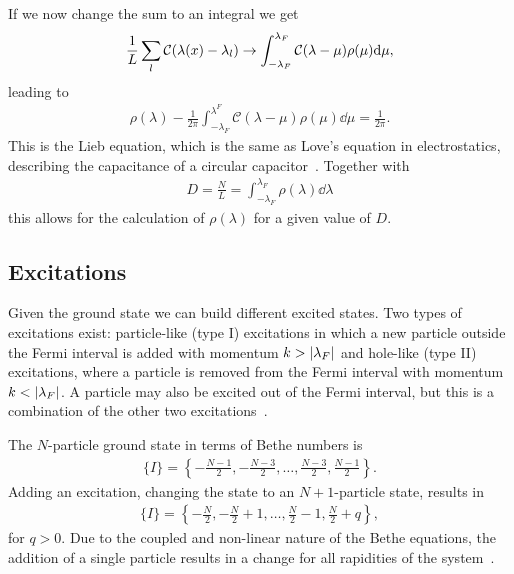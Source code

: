 \documentclass[11pt, a4paper]{report} %
\begin{document}
If we now change the sum to an integral we get 
\begin{align}
  \frac{1}{L} \sum_l \mathcal{C}\qty(\lambda(x)- \lambda_l) \to \int_{-\lambda_F}^{\lambda_F} \mathcal{C}(\lambda-\mu) \rho(\mu) \dd \mu, 
\end{align}
leading to~\cite{Korepin1993}
\begin{align}
  \rho(\lambda) - \frac{1}{2\pi} \int_{-\lambda_F}^{\lambda^F} \mathcal{C}(\lambda-\mu) \rho(\mu) \dd \mu = \frac{1}{2\pi}.
\end{align}
This is the Lieb equation, which is the same as Love's equation in electrostatics, describing the capacitance of a circular capacitor~\cite{Gaudin2009}.
Together with 
\begin{align}
  D = \frac{N}{L} = \int_{-\lambda_F}^{\lambda_F} \rho(\lambda) \dd \lambda
\end{align}
this allows for the calculation of \(\rho(\lambda)\) for a given value of \(D\).


\subsection{Excitations}

Given the ground state we can build different excited states.
Two types of excitations exist: particle-like (type I) excitations in which a new particle outside the Fermi interval is added with momentum \(k > \abs{\lambda_F}\) and hole-like (type II) excitations, where a particle is removed from the Fermi interval with momentum \(k < \abs{\lambda_F}\).
A particle may also be excited out of the Fermi interval, but this is a combination of the other two excitations~\cite{Franchini2017}.

The \(N\)-particle ground state in terms of Bethe numbers is
\begin{align}
  \label{eq:22}
  \{I\} = \left\{-\frac{N-1}{2},-\frac{N-3}{2}, \ldots, \frac{N-3}{2},\frac{N-1}{2}\right\}.
\end{align}
Adding an excitation, changing the state to an \(N+1\)-particle state, results in
\begin{align}
  \label{eq:23}
    \{I\} = \left\{-\frac{N}{2},-\frac{N}{2}+1, \ldots, \frac{N}{2}-1,\frac{N}{2}+q\right\},
\end{align}
for \(q>0\).
Due to the coupled and non-linear nature of the Bethe equations, the addition of a single particle results in a change for all rapidities of the system~\cite{Franchini2017}.
\end{document}

